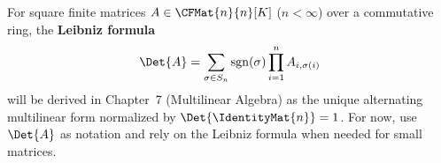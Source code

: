 \begin{remark}
    For square finite matrices $A \in \CFMat{n}{n}[K]$ ($n < \infty$) over a commutative ring,
    the \textbf{Leibniz formula}
    \[
        \Det{A} = \sum_{\sigma \in S_n} \operatorname{sgn}(\sigma) \prod_{i=1}^{n} A_{i,\sigma(i)}
    \]
    will be derived in Chapter~7 (Multilinear Algebra) as the unique alternating multilinear form
    normalized by $\Det{\IdentityMat{n}} = 1$. For now, use $\Det{A}$ as notation and rely on the Leibniz
    formula when needed for small matrices.
\end{remark}
